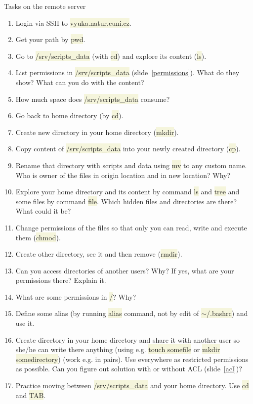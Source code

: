 \documentclass[compress, xelatex, 11pt, xcolor=svgnames, aspectratio=169,
	hyperref={
		bookmarks=true,
		unicode=true,
		colorlinks=true,
		pdftitle={Linux, command line and MetaCentrum},
		plainpages=false,
		pdfauthor={Vojtech Zeisek},
		pdfsubject={Course about use of Linux command line, writing shell scripts and using MetaCentrum of CESNET},
		pdfcreator={XeLaTeX},
		pdfkeywords={Linux, GNU, BASH, shell, command line, MetaCentrum},
		linkcolor=DarkRed, %
		anchorcolor=DarkBlue, %
		citecolor=Indigo, %
		filecolor=NavyBlue, %
		menucolor=DarkMagenta, %
		urlcolor=DarkBlue, %
		},
	url={hyphens, lowtilde} %
	]{beamer}
\renewcommand{\texttt}[1]{\colorbox{Beige}{{\ttfamily #1}}}
\begin{document}
\begin{frame}[allowframebreaks]{Tasks on the remote server}
	\begin{enumerate}
		\item Login via SSH to \texttt{vyuka.natur.cuni.cz}.
		\item Get your path by \texttt{pwd}.
		\item Go to \texttt{/srv/scripts\_data} (with \texttt{cd}) and explore its content (\texttt{ls}).
		\item List permissions in \texttt{/srv/scripts\_data} (slide~\ref{permissions}). What do they show? What can you do with the content?
		\item How much space does \texttt{/srv/scripts\_data} consume?
		\item Go back to home directory (by \texttt{cd}).
		\item Create new directory in your home directory (\texttt{mkdir}).
		\item Copy content of \texttt{/srv/scripts\_data} into your newly created directory (\texttt{cp}).
		\item Rename that directory with scripts and data using \texttt{mv} to any custom name. Who is owner of the files in origin location and in new location? Why?
		\item Explore your home directory and its content by command \texttt{ls} and \texttt{tree} and some files by command \texttt{file}. Which hidden files and directories are there? What could it be?
		\item Change permissions of the files so that only you can read, write and execute them (\texttt{chmod}).
		\item Create other directory, see it and then remove (\texttt{rmdir}).
		\item Can you access directories of another users? Why? If yes, what are your permissions there? Explain it.
		\item What are some permissions in \texttt{/}? Why?
		\item Define some alias (by running \texttt{alias} command, not by edit of \texttt{$\sim$/.bashrc}) and use it.
		\item Create directory in your home directory and share it with another user so she/he can write there anything (using e.g. \texttt{touch somefile} or \texttt{mkdir somedirectory}) (work e.g. in pairs). Use everywhere as restricted permissions as possible. Can you figure out solution with or without ACL (slide~\ref{acl})?
		\item Practice moving between \texttt{/srv/scripts\_data} and your home directory. Use \texttt{cd} and \texttt{TAB}.

\end{enumerate}
\end{frame}
\end{document}
